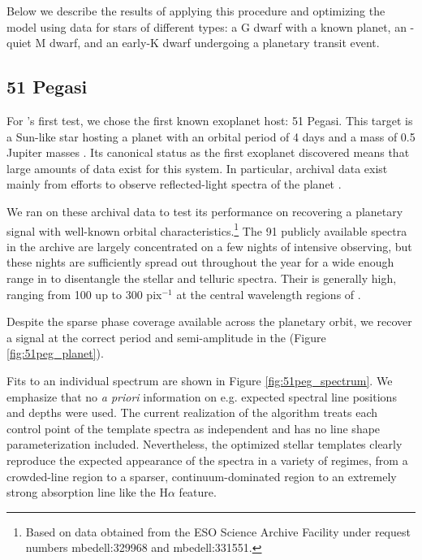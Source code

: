 \documentclass[modern]{aastex62}
\begin{document}
{Below we describe the results of applying this procedure and optimizing the \wobble model using \HARPS data for stars of different types: a G dwarf with a known planet, an \RV-quiet M dwarf, and an early-K dwarf undergoing a planetary transit event.

\subsection{51 Pegasi}

For \wobble's first test, we chose the first known exoplanet host: 51 Pegasi. 
This target is a Sun-like star hosting a planet with an orbital period of 4 days and a mass of 0.5 Jupiter masses \citep{Mayor1995}. 
Its canonical status as the first exoplanet discovered means that large amounts of data exist for this system. 
In particular, archival \HARPS data exist mainly from efforts to observe reflected-light spectra of the planet \citep{Martins2015}. 

We ran \wobble on these archival data to test its performance on recovering a planetary signal with well-known orbital characteristics.\footnote{Based on data obtained from the ESO Science Archive Facility under request numbers mbedell:329968 and mbedell:331551.} 
The 91 publicly available spectra in the \HARPS archive are largely concentrated on a few nights of intensive observing, but these nights are sufficiently spread out throughout the year for a wide enough range in \BERV to disentangle the stellar and telluric spectra. 
Their \SNR is generally high, ranging from 100 up to 300 pix$^{-1}$ at the central wavelength regions of \HARPS.

Despite the sparse phase coverage available across the planetary orbit, we recover a signal at the correct period and semi-amplitude in the \RVs (Figure \ref{fig:51peg_planet}). 

Fits to an individual spectrum are shown in Figure \ref{fig:51peg_spectrum}. 
We emphasize that no \textit{a priori} information on e.g. expected spectral line positions and depths were used. 
The current realization of the \wobble algorithm treats each control point of the template spectra as independent and has no line shape parameterization included. 
Nevertheless, the optimized stellar templates clearly reproduce the expected appearance of the spectra in a variety of regimes, from a crowded-line region to a sparser, continuum-dominated region to an extremely strong absorption line like the H$\alpha$ feature.

}
\end{document}
